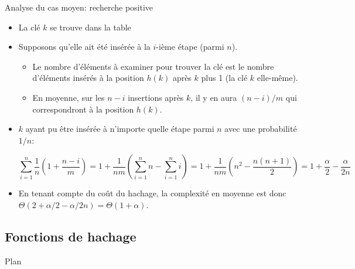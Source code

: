 \begin{frame}{Analyse du cas moyen: recherche positive}

\begin{itemize}
\item La clé $k$ se trouve dans la table
\item Supposons qu'elle ait été insérée à la $i$-ième étape (parmi $n$).
\begin{itemize}
\item Le nombre d'éléments à examiner pour trouver la clé est le
  nombre d'éléments insérés à la position $h(k)$ après $k$ plus 1 (la clé $k$ elle-même). 
\item En moyenne, sur les $n-i$ insertions après $k$, il y en aura
  $(n-i)/m$ qui correspondront à la position $h(k)$.
\end{itemize}
\item $k$ ayant pu être insérée à n'importe quelle étape parmi $n$ avec une probabilité $1/n$:
\begin{footnotesize}
$$\sum_{i=1}^n \frac{1}{n} (1+\frac{n-i}{m})=1+\frac{1}{n m}(\sum_{i=1}^n n-\sum_{i=1}^n i)=1+\frac{1}{n m} (n^2-\frac{n(n+1)}{2})=1+\frac{\alpha}{2}-\frac{\alpha}{2n}$$
\end{footnotesize}
\item En tenant compte du coût du hachage, la complexité en moyenne
  est donc $\Theta(2+\alpha/2-\alpha/2n)=\Theta(1+\alpha)$.
\end{itemize}





\end{frame}

\subsection{Fonctions de hachage}

\begin{frame}{Plan}


\end{frame}


